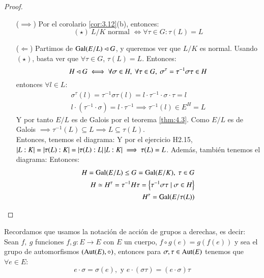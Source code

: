 \begin{proof}$ $
    \begin{itemize}
        \item[($\implies$)] Por el corolario \ref{cor:3.12}(b), entonces:
        $$
            (\star)\ L/K \text{ normal } \iff \forall \tau \in G: \tau(L) = L
        $$

        \item[($\Longleftarrow$)] Partimos de $\mathrm{Gal}(E/L) \lhd G$, y queremos ver que $L/K$ es normal. Usando $(\star)$, basta ver que $\forall \tau \in G$, $\tau(L) = L$. Entonces:
        $$
            H \lhd G \iff \forall \sigma \in H,\ \forall \tau \in G,\ \sigma^\tau = \tau^{-1} \sigma \tau \in H
        $$
        entonces $\forall l \in L$:
        \begin{align*}
            \sigma^\tau(l) = \tau^{-1} \sigma \tau(l) = l\cdot \tau^{-1} \cdot \sigma \cdot \tau = l\\
            l \cdot (\tau^{-1} \cdot \sigma) = l \cdot \tau^{-1} \implies \tau^{-1}(l) \in E^H = L
        \end{align*}
        Y por tanto $E/L$ es de Galois por el teorema \ref{thm:4.3}. Como $E/L$ es de Galois $\implies \tau^{-1}(L) \subseteq L \implies L \subseteq \tau(L)$.\\
        Entonces, tenemos el diagrama:
        Y por el ejercicio H2.15, $\left|L:K\right| = \left|\tau(L):K\right| = \left|\tau(L):L\right|\left|L:K\right| \implies \tau(L) = L$.
        Además, también tenemos el diagrama:
        Entonces:
        \begin{align*}
            H = \mathrm{Gal}(E/L) \leq G = \mathrm{Gal}(E/K),\ \tau \in G\\
            H \simeq H^\tau = \tau^{-1} H \tau = \left\{\tau^{-1} \sigma \tau \mid \sigma \in H\right\}\\
            H^\tau = \mathrm{Gal}(E/\tau(L))
        \end{align*}
    \end{itemize}
\end{proof}

\begin{obs}[Notación]
    Recordamos que usamos la notación de acción de grupos a derechas, es decir:\\
    Sean $f,\ g$ funciones $f,g: E \to E$ con $E$ un cuerpo, $f \circ g (e) = g (f (e))$ y sea el grupo de automorfismos $(\mathrm{Aut}(E), \circ)$, entonces para $\sigma, \tau \in  \mathrm{Aut}(E)$ tenemos que $\forall e \in E$:
    $$
        e \cdot \sigma = \sigma(e),\text{ y } e \cdot (\sigma \tau) = (e \cdot \sigma) \tau
    $$
\end{obs}

